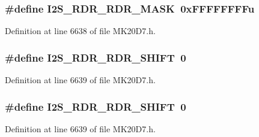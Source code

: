 \subsubsection[{\texorpdfstring{I2\+S\+\_\+\+R\+D\+R\+\_\+\+R\+D\+R\+\_\+\+M\+A\+SK}{I2S_RDR_RDR_MASK}}]{\setlength{\rightskip}{0pt plus 5cm}\#define I2\+S\+\_\+\+R\+D\+R\+\_\+\+R\+D\+R\+\_\+\+M\+A\+SK~0x\+F\+F\+F\+F\+F\+F\+F\+Fu}\hypertarget{group___i2_s___register___masks_gaccf614975eae2e2df22dafe25a0f15e5}{}\label{group___i2_s___register___masks_gaccf614975eae2e2df22dafe25a0f15e5}


Definition at line 6638 of file M\+K20\+D7.\+h.

\subsubsection[{\texorpdfstring{I2\+S\+\_\+\+R\+D\+R\+\_\+\+R\+D\+R\+\_\+\+S\+H\+I\+FT}{I2S_RDR_RDR_SHIFT}}]{\setlength{\rightskip}{0pt plus 5cm}\#define I2\+S\+\_\+\+R\+D\+R\+\_\+\+R\+D\+R\+\_\+\+S\+H\+I\+FT~0}\hypertarget{group___i2_s___register___masks_ga044f3938825909104af369aa0c62f2f5}{}\label{group___i2_s___register___masks_ga044f3938825909104af369aa0c62f2f5}


Definition at line 6639 of file M\+K20\+D7.\+h.

\subsubsection[{\texorpdfstring{I2\+S\+\_\+\+R\+D\+R\+\_\+\+R\+D\+R\+\_\+\+S\+H\+I\+FT}{I2S_RDR_RDR_SHIFT}}]{\setlength{\rightskip}{0pt plus 5cm}\#define I2\+S\+\_\+\+R\+D\+R\+\_\+\+R\+D\+R\+\_\+\+S\+H\+I\+FT~0}\hypertarget{group___i2_s___register___masks_ga044f3938825909104af369aa0c62f2f5}{}\label{group___i2_s___register___masks_ga044f3938825909104af369aa0c62f2f5}


Definition at line 6639 of file M\+K20\+D7.\+h.

